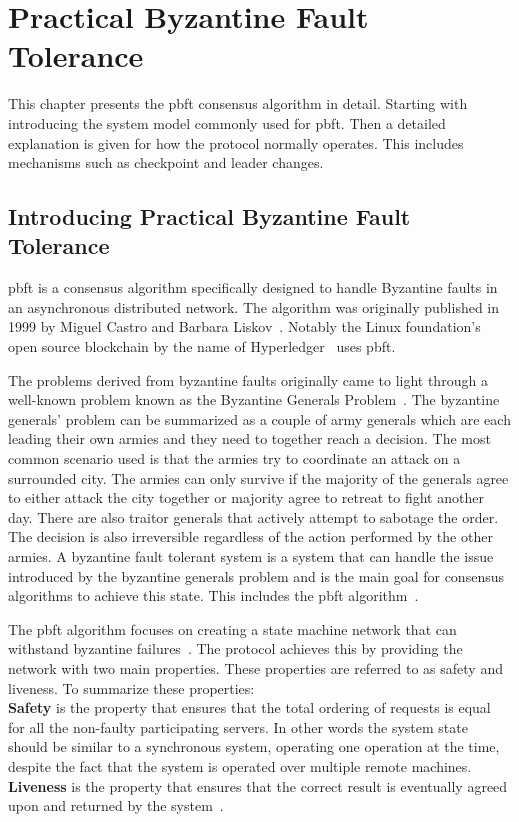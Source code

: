 \chapter{Practical Byzantine Fault Tolerance}
\label{chapter:PBFT}
This chapter presents the \acl{pbft} consensus algorithm in detail.
Starting with introducing the system model commonly used for \ac{pbft}. Then a detailed explanation is given for how the protocol normally operates. This includes mechanisms such as checkpoint and leader changes.

\section{Introducing Practical Byzantine Fault Tolerance}
\acl{pbft} is a consensus algorithm specifically designed to handle Byzantine faults in an asynchronous distributed network. The algorithm was originally published in 1999 by Miguel Castro and Barbara Liskov~\cite{PAPER:OGPBFT}.
Notably the Linux foundation's open source blockchain by the name of Hyperledger~\cite{WEB:PBFTGeeks, SLIDES:PBFT} uses \ac{pbft}.

The problems derived from byzantine faults originally came to light through a well-known problem known as the Byzantine Generals Problem~\cites{WEB:BFTInfo}{ART:lamportByzGenProb}[p.~240-253]{BOOK:BuildDepDistSyst}.
The byzantine generals' problem can be summarized as a couple of army generals which are each leading their own armies and they need to together reach a decision. The most common scenario used is  that the armies try to coordinate an attack on a surrounded city. The armies can only survive if the majority of the generals agree to either attack the city together or majority agree to retreat to fight another day. There are also traitor generals that actively attempt to sabotage the order. The decision is also irreversible regardless of the action performed by the other armies. A byzantine fault tolerant system is a system that can handle the issue introduced by the byzantine generals problem and is the main goal for consensus algorithms to achieve this state. This includes the \ac{pbft} algorithm~\cite{WEB:BFTInfo, ART:lamportByzGenProb}.

The \ac{pbft} algorithm focuses on creating a state machine network that can withstand byzantine failures~\cite[p.~456]{BOOK:MVstandver3}. The protocol achieves this by providing the network with two main properties. These properties are referred to as safety and liveness.
To summarize these properties:\\
\textbf{Safety} is the property that ensures that the total ordering of requests is equal for all the non-faulty participating servers. In other words the system state should be similar to a synchronous system, operating one operation at the time, despite the fact that the system is operated over multiple remote machines.\\
\textbf{Liveness} is the property that ensures that the correct result is eventually agreed upon and returned by the system~\cites[p.~456]{BOOK:MVstandver3}{WEB:ConsesAlgo}[p.~2]{PAPER:OGPBFT}{SLIDES:PBFT}[p.~403]{PAPER:PBFTRecovery}[p.~257]{BOOK:BuildDepDistSyst}.

